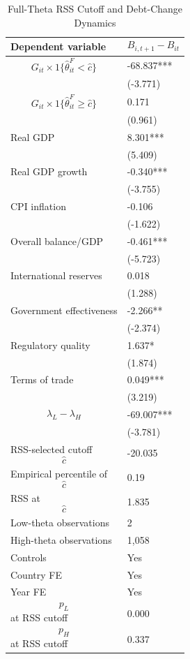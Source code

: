 \begin{table}[H]\centering
\begin{threeparttable}
\caption{Full-Theta RSS Cutoff and Debt-Change Dynamics}
\label{tab:deltaB_rss_cutoff_fulltheta}
\scriptsize
\begin{tabularx}{\textwidth}{lY}
\toprule
Dependent variable & $$B_{i,t+1}-B_{it}$$ \\
\midrule
$$G_{it}\times 1\{\widehat{\theta}^{F}_{it}<\widehat{c}\}$$ & -68.837*** \\
 & (-3.771) \\
$$G_{it}\times 1\{\widehat{\theta}^{F}_{it}\geq\widehat{c}\}$$ & 0.171 \\
 & (0.961) \\
Real GDP & 8.301*** \\
 & (5.409) \\
Real GDP growth & -0.340*** \\
 & (-3.755) \\
CPI inflation & -0.106 \\
 & (-1.622) \\
Overall balance/GDP & -0.461*** \\
 & (-5.723) \\
International reserves & 0.018 \\
 & (1.288) \\
Government effectiveness & -2.266** \\
 & (-2.374) \\
Regulatory quality & 1.637* \\
 & (1.874) \\
Terms of trade & 0.049*** \\
 & (3.219) \\
$$\lambda_L-\lambda_H$$ & -69.007*** \\
 & (-3.781) \\
\midrule
RSS-selected cutoff $$\widehat{c}$$ & -20.035 \\
Empirical percentile of $$\widehat{c}$$ & 0.19 \\
RSS at $$\widehat{c}$$ & 1.835 \\
Low-theta observations & 2 \\
High-theta observations & 1,058 \\
Controls & Yes \\
Country FE & Yes \\
Year FE & Yes \\
$$p_L$$ at RSS cutoff & 0.000 \\
$$p_H$$ at RSS cutoff & 0.337 \\

\end{tabularx}
\end{threeparttable}
\end{table}

